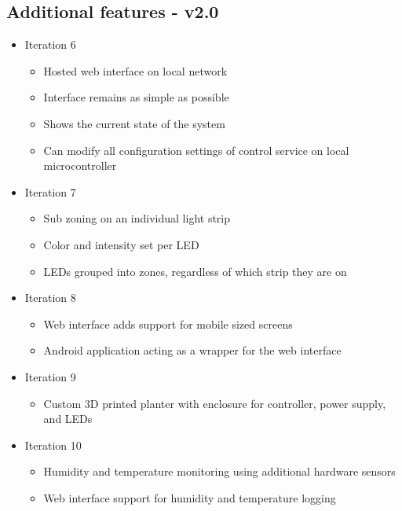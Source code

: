 \documentclass[onecolumn, draftclsnofoot,10pt, compsoc]{IEEEtran}
\begin{document}
		\subsection{Additional features - v2.0}
			\begin{itemize}
				\item Iteration 6
					\begin{itemize}
						\item Hosted web interface on local network
						\item Interface remains as simple as possible
						\item Shows the current state of the system
						\item Can modify all configuration settings of control service on local microcontroller
					\end{itemize}
				\item Iteration 7
					\begin{itemize}
						\item Sub zoning on an individual light strip
						\item Color and intensity set per LED
						\item LEDs grouped into zones, regardless of which strip they are on
					\end{itemize}
				\item Iteration 8
					\begin{itemize}
						\item Web interface adds support for mobile sized screens
						\item Android application acting as a wrapper for the web interface
					\end{itemize}
				\item Iteration 9
					\begin{itemize}
						\item Custom 3D printed planter with enclosure for controller, power supply, and LEDs
					\end{itemize}
				\item Iteration 10
					\begin{itemize}
						\item Humidity and temperature monitoring using additional hardware sensors
						\item Web interface support for humidity and temperature logging
					\end{itemize}
			\end{itemize}
\end{document}
